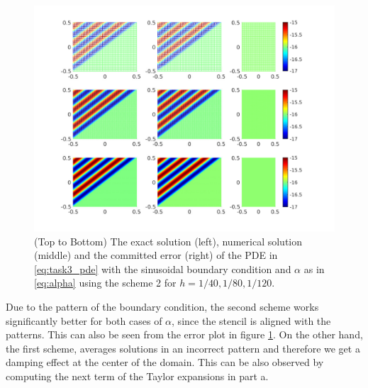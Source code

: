 \documentclass[10pt,a4paper,twoside, french]{article}
\numberwithin{equation}{section}
\numberwithin{figure}{section}
\numberwithin{table}{section}
\begin{document}
\begin{enumerate}
\begin{enumerate}[a.]
\begin{figure}[h]
\includegraphics[scale=.8]{fig/task3_scheme2_a10_N_40_80_120}
\caption{(Top to Bottom) The exact solution (left), numerical solution (middle) and the committed error (right) of the PDE in \eqref{eq:task3_pde} with the sinusoidal boundary condition and $\alpha$ as in \eqref{eq:alpha} using the scheme 2 for $h = 1/40, 1/80, 1/120$.}
\label{fig:task3_scheme2_alpha01}
\end{figure}

Due to the pattern of the boundary condition, the second scheme works significantly better for both cases of $\alpha$, since the stencil is aligned with the patterns. This can also be seen from the error plot in figure \ref{fig:task3_scheme2_alpha01}. On the other hand, the first scheme, averages solutions in an incorrect pattern and therefore we get a damping effect at the center of the domain. This can be also observed by computing the next term of the Taylor expansions in part a.

\end{enumerate}


\end{enumerate}
	
	
	
	
\end{document}
